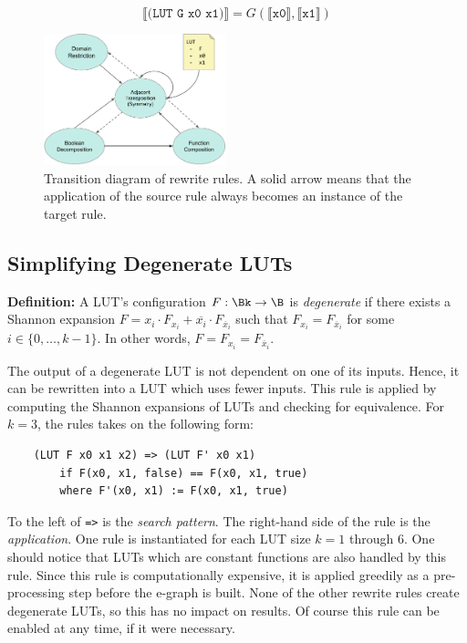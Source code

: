 \begin{equation}
    \llbracket \texttt{(LUT G x0 x1)} \rrbracket = G(\llbracket \texttt{x0} \rrbracket, \llbracket \texttt{x1} \rrbracket)
\end{equation}

\begin{figure}
    \centering
    \includegraphics[width=0.47\textwidth]{img/rewrites.png}
    \caption{Transition diagram of rewrite rules. A solid arrow means that the application of the source rule always becomes an instance of the target rule.}\label{fig:rewrites}
    \Description[]{}
\end{figure}

\subsection{Simplifying Degenerate LUTs}\label{sec:rewrites:degen}

\textbf{Definition:} A LUT's configuration $F : \Bk \rightarrow \B$ is \textit{degenerate} if there exists a Shannon expansion $F = x_i \cdot F_{x_i} + \overline{x_i} \cdot F_{\overline{x}_i}$
such that $F_{x_i} = F_{\overline{x}_i}$ for some $i \in \{ 0, \ldots, k -1\}$. In other words, $F = F_{x_i} = F_{\overline{x}_i}$.

The output of a degenerate LUT is not dependent on one of its inputs. Hence, it
can be rewritten into a LUT which uses fewer inputs. This rule is applied by
computing the Shannon expansions of LUTs and checking for equivalence. For
$k=3$, the rules takes on the following form:

\begin{verbatim}
    (LUT F x0 x1 x2) => (LUT F' x0 x1)
        if F(x0, x1, false) == F(x0, x1, true)
        where F'(x0, x1) := F(x0, x1, true)
\end{verbatim}

To the left of \texttt{=>} is the \textit{search pattern}. The right-hand side
of the rule is the \textit{application}. One rule is instantiated for each LUT
size $k =1$ through 6. One should notice that LUTs which are constant functions
are also handled by this rule. Since this rule is computationally expensive, it
is applied greedily as a pre-processing step before the e-graph is built. None
of the other rewrite rules create degenerate LUTs, so this has no impact on
results. Of course this rule can be enabled at any time, if it were necessary.


